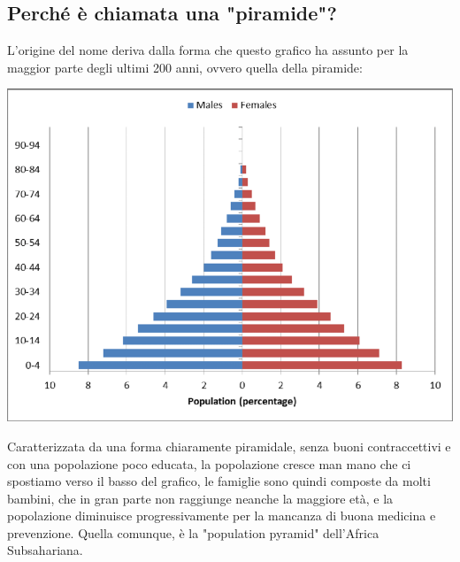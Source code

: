 \documentclass[11pt, oneside]{article}   	%
\begin{document}
\subsection{Perché è chiamata una "piramide"?}
L'origine del nome deriva dalla forma che questo grafico ha assunto per la maggior parte degli ultimi 200 anni, ovvero quella della piramide:
\begin{center}
\includegraphics[scale=0.5]{pyramid.png}
\end{center}
Caratterizzata da una forma chiaramente piramidale, senza buoni contraccettivi e con una popolazione poco educata, la popolazione cresce man mano che ci spostiamo verso il basso del grafico, le famiglie sono quindi composte da molti bambini, che in gran parte non raggiunge neanche la maggiore età, e la popolazione diminuisce progressivamente per la mancanza di buona medicina e prevenzione. Quella comunque, è la "population pyramid" dell'Africa Subsahariana.
\end{document}
